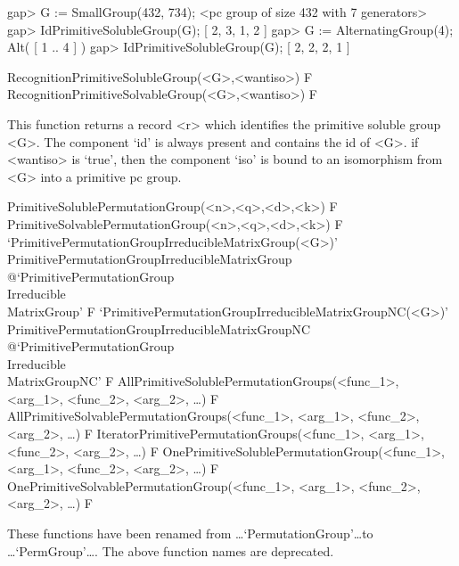 \beginexample
gap> G := SmallGroup(432, 734);
<pc group of size 432 with 7 generators>
gap> IdPrimitiveSolubleGroup(G);
[ 2, 3, 1, 2 ]
gap> G := AlternatingGroup(4);
Alt( [ 1 .. 4 ] )
gap> IdPrimitiveSolubleGroup(G);
[ 2, 2, 2, 1 ]
\endexample

\>RecognitionPrimitiveSolubleGroup(<G>,<wantiso>) F
\>RecognitionPrimitiveSolvableGroup(<G>,<wantiso>) F

This function returns a record <r> which identifies the primitive soluble group <G>.
The component `id' is always present and contains the id of <G>. if <wantiso> is `true', then
the component `iso' is bound to an isomorphism from <G> into a primitive pc group.

\null


\>PrimitiveSolublePermutationGroup(<n>,<q>,<d>,<k>) F
\>PrimitiveSolvablePermutationGroup(<n>,<q>,<d>,<k>) F
\>`PrimitivePermutationGroupIrreducibleMatrixGroup(<G>)'%
{PrimitivePermutationGroupIrreducibleMatrixGroup}%
@{`PrimitivePermutationGroup\\Irreducible\\MatrixGroup'} F
\>`PrimitivePermutationGroupIrreducibleMatrixGroupNC(<G>)'%
{PrimitivePermutationGroupIrreducibleMatrixGroupNC}%
@{`PrimitivePermutationGroup\\Irreducible\\MatrixGroupNC'} F
\>AllPrimitiveSolublePermutationGroups(<func_1>, <arg_1>, <func_2>, <arg_2>, \dots) F
\>AllPrimitiveSolvablePermutationGroups(<func_1>, <arg_1>, <func_2>, <arg_2>, \dots) F
\>IteratorPrimitivePermutationGroups(<func_1>, <arg_1>, <func_2>, <arg_2>, \dots) F
\>OnePrimitiveSolublePermutationGroup(<func_1>, <arg_1>, <func_2>, <arg_2>, \dots) F
\>OnePrimitiveSolvablePermutationGroup(<func_1>, <arg_1>, <func_2>, <arg_2>, \dots) F

These functions have been renamed from \dots `PermutationGroup'\dots to \dots `PermGroup'\dots.
The above function names are deprecated.



